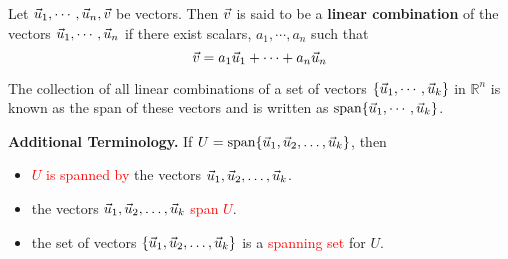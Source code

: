 \documentclass[pdf]{beamer}
\begin{document}
{{\begin{definition}
Let $\vec{u}_1,\cdots ,\vec{u}_n, \vec{v}$ be vectors. Then 
$\vec{v}$ is said to be a \textbf{linear combination }
of the vectors $\vec{u}_1,\cdots , \vec{u}_n $ 
if there exist scalars, $a_{1},\cdots ,a_{n}$ such
that
\begin{equation*}
\vec{v} = a_1 \vec{u}_1 + \cdots + a_n \vec{u}_n
\end{equation*}
\end{definition}

\medskip

\pause

\begin{definition}
The collection of all linear combinations of a set of vectors $\{ \vec{u}_1,
\cdots ,\vec{u}_k\}$ in $\mathbb{R}^{n}$ is known as the span of these
vectors and is written as $\mbox{span} \{\vec{u}_1, \cdots , \vec{u}_k\}$.
\end{definition}

\pause
\medskip

{\bf Additional Terminology.}
If $U=\mbox{span} \{\vec{u}_1, \vec{u}_2, \ldots, \vec{u}_k\}$, then 
\begin{itemize}
\item \textcolor{red}{$U$ is spanned by} the vectors 
$\vec{u}_1, \vec{u}_2, \ldots, \vec{u}_k$.
\item the vectors $\vec{u}_1, \vec{u}_2, \ldots, \vec{u}_k$ 
\textcolor{red}{span $U$}.
\item the set of vectors $\{ \vec{u}_1, \vec{u}_2, \ldots, \vec{u}_k\}$ is
a \textcolor{red}{spanning set} for $U$.
\end{itemize}
}

}
\end{document}

